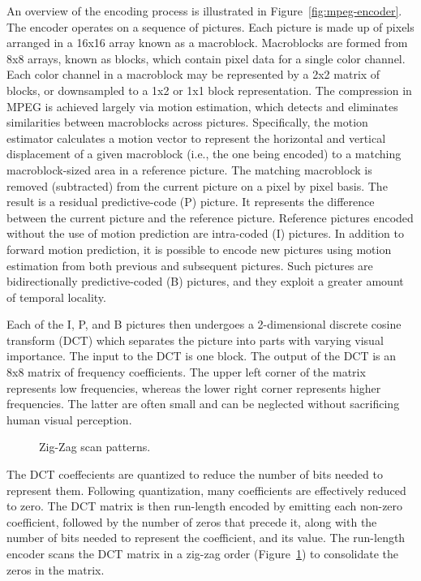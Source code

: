 An overview of the encoding process is illustrated in
Figure~\ref{fig:mpeg-encoder}. The encoder operates on a sequence of
pictures. Each picture is made up of pixels arranged in a 16x16 array
known as a macroblock. Macroblocks are formed from 8x8 arrays, 
known as blocks, which contain pixel data for a single color channel. 
Each color channel in a macroblock may be represented by a 2x2 matrix
of blocks, or downsampled to a 1x2 or 1x1 block representation.
The compression in MPEG is achieved largely via motion estimation, which
detects and eliminates similarities between macroblocks across
pictures. Specifically, the motion estimator calculates a motion
vector to represent the horizontal and vertical displacement of a
given macroblock (i.e., the one being encoded) to a matching
macroblock-sized area in a reference picture. 
The matching macroblock is removed (subtracted) from the
current picture on a pixel by pixel basis. The result is a residual
predictive-code (P) picture. It represents the difference between the
current picture and the reference picture. Reference pictures encoded without
the use of motion prediction are intra-coded (I) pictures. In addition to forward
motion prediction, it is possible to encode new pictures using motion
estimation from both previous and subsequent pictures. Such pictures
are bidirectionally predictive-coded (B) pictures, and they exploit a
greater amount of temporal locality.

Each of the I, P, and B pictures then undergoes a 2-dimensional
discrete cosine transform (DCT) which separates the picture into parts
with varying visual importance. The input to the DCT is one block. 
The output of the
DCT is an 8x8 matrix of frequency coefficients. The upper left corner
of the matrix represents low frequencies, whereas the lower right
corner represents higher frequencies. The latter are often small and
can be neglected without sacrificing human visual perception.

\begin{figure}[t]
\begin{center}
\vspace{-12pt}
 \caption{Zig-Zag scan patterns.}
 \label{fig:zigzag}
\end{center}
\end{figure}

The DCT coeffecients are quantized to reduce the number of bits needed
to represent them. Following quantization, many coefficients are
effectively reduced to zero. The DCT matrix is then run-length
encoded by emitting each non-zero coefficient, followed by the number
of zeros that precede it, along with the number of bits needed to
represent the coefficient, and its value. The run-length encoder
scans the DCT matrix in a zig-zag order (Figure~\ref{fig:zigzag}) to
consolidate the zeros in the matrix.

